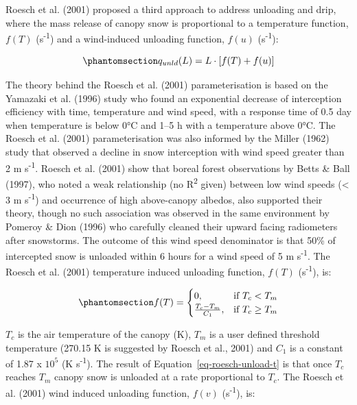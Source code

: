 \documentclass[
  letterpaper,
]{tex/uofsthesis-cs}
\begin{document}
Roesch et al. (2001) proposed a third approach to address unloading and
drip, where the mass release of canopy snow is proportional to a
temperature function, \(f(T)\) (s\textsuperscript{-1}) and a
wind-induced unloading function, \(f(u)\) (s\textsuperscript{-1}):

\begin{equation}\phantomsection\label{eq-roesch-unload}{
q_{unld}(L) = L \cdot [f(T) + f(u)]
}\end{equation}

The theory behind the Roesch et al. (2001) parameterisation is based on
the Yamazaki et al. (1996) study who found an exponential decrease of
interception efficiency with time, temperature and wind speed, with a
response time of 0.5 day when temperature is below 0°C and 1--5 h with a
temperature above 0°C. The Roesch et al. (2001) parameterisation was
also informed by the Miller (1962) study that observed a decline in snow
interception with wind speed greater than 2 m s\textsuperscript{-1}.
Roesch et al. (2001) show that boreal forest observations by Betts \&
Ball (1997), who noted a weak relationship (no R\textsuperscript{2}
given) between low wind speeds (\textless{} 3 m s\textsuperscript{-1})
and occurrence of high above-canopy albedos, also supported their
theory, though no such association was observed in the same environment
by Pomeroy \& Dion (1996) who carefully cleaned their upward facing
radiometers after snowstorms. The outcome of this wind speed denominator
is that 50\% of intercepted snow is unloaded within 6 hours for a wind
speed of 5 m s\textsuperscript{-1}. The Roesch et al. (2001) temperature
induced unloading function, \(f(T)\) (s\textsuperscript{-1}), is:

\begin{equation}\phantomsection\label{eq-roesch-unload-t}{
f(T) = \begin{cases}
    0,& \text{if } T_c < T_m \\
    \frac{T_c - T_m}{C_1},              & \text{if }  T_c \ge T_m
\end{cases}
}\end{equation}

\(T_c\) is the air temperature of the canopy (K), \(T_m\) is a user
defined threshold temperature (270.15 K is suggested by Roesch et al.,
2001) and \(C_1\) is a constant of 1.87 x \(10^5\) (K
s\textsuperscript{-1}). The result of Equation~\ref{eq-roesch-unload-t}
is that once \(T_c\) reaches \(T_m\) canopy snow is unloaded at a rate
proportional to \(T_c\). The Roesch et al. (2001) wind induced unloading
function, \(f(v)\) (s\textsuperscript{-1}), is:
\end{document}
